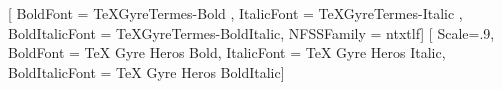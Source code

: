 

\ifluatex
  \usepackage[no-math]{fontspec}
  \setmainfont{TeXGyreTermes-Regular}[
       BoldFont       = TeXGyreTermes-Bold ,
       ItalicFont     = TeXGyreTermes-Italic ,
       BoldItalicFont = TeXGyreTermes-BoldItalic,
       NFSSFamily     = ntxtlf]
  \setsansfont{TeX Gyre Heros Regular}[
       Scale=.9,
       BoldFont       = TeX Gyre Heros Bold,
       ItalicFont     = TeX Gyre Heros Italic,
       BoldItalicFont = TeX Gyre Heros BoldItalic]
  \setmonofont[StylisticSet={1,3},Scale=.9]{inconsolata}
  \RequirePackage{newtxmath}
\else
  \RequirePackage{newtxtext}
  \RequirePackage{newtxmath}
  \RequirePackage[varl,scaled=.9]{inconsolata}
\fi


\usepackage{upquote}

%

%

\usepackage{textcomp}

\def\delsym#1{%
  \expandafter\let\csname#1\endcsname=\relax
}



